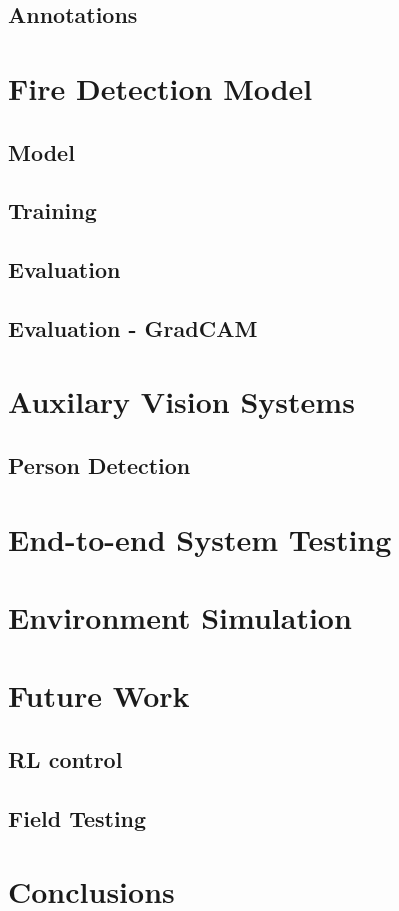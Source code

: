   \subsection{Annotations}

\section{Fire Detection Model}\label{sec:detection}

  \subsection{Model}

  \subsection{Training}
    
  \subsection{Evaluation}

  \subsection{Evaluation - GradCAM}

\section{Auxilary Vision Systems}\label{sec:other}

  \subsection{Person Detection}

\section{End-to-end System Testing}

  \section{Environment Simulation}

\section{Future Work}\label{sec:future_work}

  \subsection{RL control}

  \subsection{Field Testing}

\section{Conclusions}\label{sec:conclusions}



